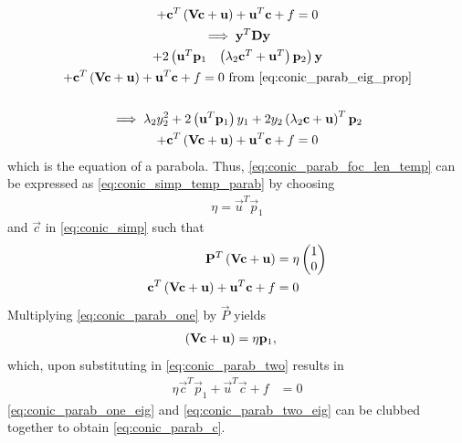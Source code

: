 \documentclass[journal,12pt,twocolumn]{IEEEtran}
\renewcommand\thesection{\arabic{section}}
\renewcommand\thesubsection{\thesection.\arabic{subsection}}
\begin{document}
\begin{enumerate}[label=\thesubsection.\arabic*.,ref=\thesubsection.\theenumi]
\begin{multline}
\\
+  \mathbf{c}^T\left(\mathbf{V}\mathbf{c} + \mathbf{u}\right)+ \mathbf{u}^T\mathbf{c} + f= 0
\\
\implies \mathbf{y}^T\mathbf{D}\mathbf{y}
\\
+2\begin{pmatrix}\mathbf{u}^T\mathbf{p}_1 & \left(\lambda_2\mathbf{c}^T+\mathbf{u}^T\right)\mathbf{p}_2\end{pmatrix}\mathbf{y}
\\
+  \mathbf{c}^T\left(\mathbf{V}\mathbf{c} + \mathbf{u}\right)+ \mathbf{u}^T\mathbf{c} + f= 0
\text{ from } \eqref{eq:conic_parab_eig_prop}     \nonumber \\
\\
\implies \lambda_2y_2^2+2\left(\mathbf{u}^T\mathbf{p}_1\right)y_1+  2y_2\left(\lambda_2\mathbf{c}+\mathbf{u}\right)^T\mathbf{p}_2
\\
+  \mathbf{c}^T\left(\mathbf{V}\mathbf{c} + \mathbf{u}\right)+ \mathbf{u}^T\mathbf{c} + f= 0
\label{eq:conic_parab_foc_len_temp} 
\end{multline}
which is the equation of a parabola. 
Thus, \eqref{eq:conic_parab_foc_len_temp} 
can be expressed as \eqref{eq:conic_simp_temp_parab} by choosing
\begin{align}
\eta = \vec{u}^T\vec{p}_1
\end{align}
and $\vec{c}$ in \eqref{eq:conic_simp} such that
\begin{align}
\label{eq:conic_parab_one}
\mathbf{P}^{T}\left(\mathbf{V}\mathbf{c}+\mathbf{u}\right) &= \eta\begin{pmatrix}1\\0\end{pmatrix}
\\
\mathbf{c}^T\left(\mathbf{V}\mathbf{c} + \mathbf{u}\right)+ \mathbf{u}^T\mathbf{c} + f&= 0
\label{eq:conic_parab_two}
\end{align}
Multiplying \eqref{eq:conic_parab_one} by $\vec{P}$ yields
\begin{align}
\label{eq:conic_parab_one_eig}
\left(\mathbf{V}\mathbf{c}+\mathbf{u}\right) &= \eta\mathbf{p}_1,
\end{align}
which, upon substituting in \eqref{eq:conic_parab_two}
results in 
\begin{align}
\eta\vec{c}^T\vec{p}_1 + \vec{u}^T\vec{c} + f&= 0
\label{eq:conic_parab_two_eig}
\end{align}
\eqref{eq:conic_parab_one_eig} and \eqref{eq:conic_parab_two_eig} can be clubbed together to obtain \eqref{eq:conic_parab_c}.


\end{enumerate}
\end{document}
